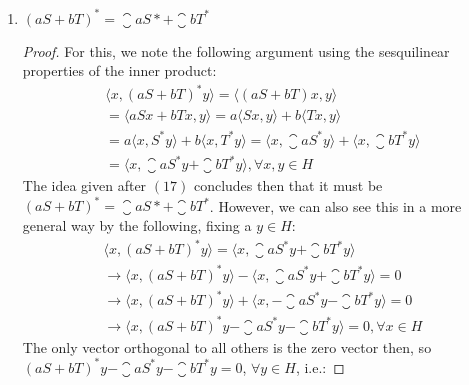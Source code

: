 \documentclass[12pt]{article}
\newenvironment{ex}[2][Exercise]{\begin{trivlist}
\item[\hskip \labelsep {\bfseries #1}\hskip \labelsep {\bfseries #2.}]}{\end{trivlist}}
\begin{document}
\begin{ex}{8}
\begin{enumerate}[label=(\alph*)]
\begin{enumerate}[label=(\roman*)]
\begin{proof}
\begin{equation}
                \end{equation} 
                Thus $||TT^*|| = ||T||^2$.
            \end{proof}
            \item $(aS + bT)^* = \closure{a}S* + \closure{b}T^*$
            \begin{proof}
                For this, we note the following argument using the sesquilinear properties of the inner product:
                \begin{equation}
                    \begin{aligned}
                        \langle x, (aS + bT)^*y \rangle = \langle (aS + bT)x, y \rangle \\
                        = \langle aSx + bTx, y \rangle = a\langle Sx, y \rangle + b\langle Tx, y \rangle \\
                        = a\langle x, S^*y\rangle + b\langle x, T^*y\rangle = \langle x, \closure{a}S^*y \rangle + \langle x, \closure{b}T^*y \rangle \\
                        = \langle x, \closure{a}S^*y + \closure{b}T^*y \rangle, \forall x, y \in H
                    \end{aligned}
                \end{equation}
                The idea given after $(17)$ concludes then that it must be $(aS + bT)^* = \closure{a}S* + \closure{b}T^*$. However, we can also see this in a more general way by the following, fixing a $y \in H$:
                \begin{equation}
                    \begin{aligned}
                    \langle x, (aS + bT)^*y \rangle = \langle x, \closure{a}S^*y + \closure{b}T^*y \rangle \\
                    \rightarrow \langle x, (aS + bT)^*y \rangle - \langle x, \closure{a}S^*y + \closure{b}T^*y \rangle = 0 \\
                    \rightarrow \langle x, (aS + bT)^*y \rangle + \langle x, -\closure{a}S^*y - \closure{b}T^*y \rangle = 0 \\
                    \rightarrow \langle x, (aS + bT)^*y -\closure{a}S^*y - \closure{b}T^*y \rangle = 0, \forall x \in H
                    \end{aligned}
                \end{equation}
                The only vector orthogonal to all others is the zero vector then, so $(aS + bT)^*y -\closure{a}S^*y - \closure{b}T^*y = 0$, $\forall y \in H$, i.e.:

\end{proof}
\end{enumerate}
\end{enumerate}
\end{ex}
\end{document}
